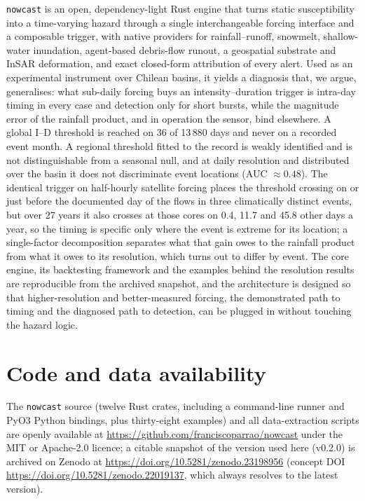\documentclass[authoryear,preprint,review,12pt]{elsarticle}
\begin{document}
\texttt{nowcast} is an open, dependency-light Rust engine that turns static
susceptibility into a time-varying hazard through a single interchangeable forcing
interface and a composable trigger, with native providers for rainfall--runoff,
snowmelt, shallow-water inundation, agent-based debris-flow runout, a geospatial
substrate and InSAR deformation, and exact closed-form attribution of every alert.
Used as an experimental instrument over Chilean basins, it yields a diagnosis that, we argue, generalises: what sub-daily forcing buys an intensity--duration trigger is intra-day timing in every case and detection only for short bursts, while the magnitude error of the rainfall product, and in operation the sensor, bind elsewhere. A global I--D threshold is reached on 36 of 13\,880 days and never on a recorded event month. A regional threshold fitted to the record is weakly identified and is not distinguishable from a seasonal null, and at daily resolution and distributed over the basin it does not discriminate event locations (AUC $\approx 0.48$). The identical trigger on half-hourly satellite forcing places
the threshold crossing on or just before the documented day of the flows in three
climatically distinct events, but over 27 years it also crosses at those cores on
0.4, 11.7 and 45.8 other days a year, so the timing is specific only where the event
is extreme for its location; a single-factor decomposition separates what that
gain owes to the rainfall product from what it owes to its resolution, which turns
out to differ by event. The core engine, its backtesting framework and the
examples behind the resolution results are reproducible from the archived snapshot, and the architecture is designed so that
higher-resolution and better-measured forcing, the demonstrated path to timing and the diagnosed path to detection, can be plugged in
without touching the hazard logic.

\section*{Code and data availability}

The \texttt{nowcast} source (twelve Rust crates, including a command-line runner and
PyO3 Python bindings, plus thirty-eight examples) and all data-extraction scripts
are openly available at \url{https://github.com/franciscoparrao/nowcast} under the
MIT or Apache-2.0 licence; a citable snapshot of the version used here (v0.2.0) is archived on
Zenodo at \url{https://doi.org/10.5281/zenodo.23198956} (concept DOI
\url{https://doi.org/10.5281/zenodo.22019137}, which always resolves to the
latest version). 
\end{document}
